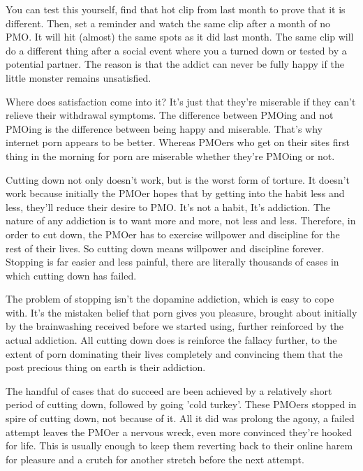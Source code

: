 \documentclass[easypeasy.tex]{subfiles}
\begin{document}
You can test this yourself, find that hot clip from last month to prove that it is different. Then, set a reminder and watch the same clip after a month of no PMO. It will hit (almost) the same spots as it did last month. The same clip will do a different thing after a social event where you a turned down or tested by a potential partner. The reason is that the addict can never be fully happy if the little monster remains unsatisfied.

Where does satisfaction come into it? It's just that they're miserable if they can't relieve their withdrawal symptoms. The difference between PMOing and not PMOing is the difference between being happy and miserable. That's why internet porn appears to be better. Whereas PMOers who get on their sites first thing in the morning for porn are miserable whether they're PMOing or not.

Cutting down not only doesn't work, but is the worst form of torture. It doesn't work because initially the PMOer hopes that by getting into the habit less and less, they'll reduce their desire to PMO. It's not a habit, It's addiction. The nature of any addiction is to want more and more, not less and less. Therefore, in order to cut down, the PMOer has to exercise willpower and discipline for the rest of their lives. So cutting down means willpower and discipline forever. Stopping is far easier and less painful, there are literally thousands of cases in which cutting down has failed.

The problem of stopping isn't the dopamine addiction, which is easy to cope with. It's the mistaken belief that porn gives you pleasure, brought about initially by the brainwashing received before we started using, further reinforced by the actual addiction. All cutting down does is reinforce the fallacy further, to the extent of porn dominating their lives completely and convincing them that the post precious thing on earth is their addiction.

The handful of cases that do succeed are been achieved by a relatively short period of cutting down, followed by going 'cold turkey'. These PMOers stopped in spire of cutting down, not because of it. All it did was prolong the agony, a failed attempt leaves the PMOer a nervous wreck, even more convinced they're hooked for life. This is usually enough to keep them reverting back to their online harem for pleasure and a crutch for another stretch before the next attempt.
\end{document}
